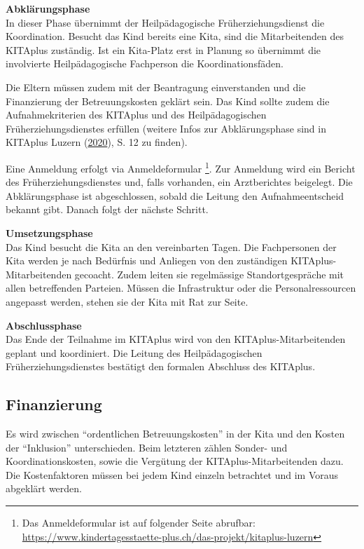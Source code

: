 \documentclass[
  ngerman,
  11pt,
  paper=a4,
  twoside,
  titlepage=true,
  openright,
  abstract=on,
  toc=listofnumbered,
  numbers=noenddot,
  chapterprefix=true,
  headings=optiontohead,
  svgnames,
  dvipsnames]{scrreprt}
\begin{document}
\textbf{Abklärungsphase}\\
In dieser Phase übernimmt der Heilpädagogische Früherziehungsdienst die
Koordination. Besucht das Kind bereits eine Kita, sind die
Mitarbeitenden des KITAplus zuständig. Ist ein Kita-Platz erst in
Planung so übernimmt die involvierte Heilpädagogische Fachperson die
Koordinationsfäden.

Die Eltern müssen zudem mit der Beantragung einverstanden und die
Finanzierung der Betreuungskosten geklärt sein. Das Kind sollte zudem
die Aufnahmekriterien des KITAplus und des Heilpädagogischen
Früherziehungsdienstes erfüllen (weitere Infos zur Abklärungsphase sind
in KITAplus Luzern (\protect\hyperlink{ref-konzeptKitaPlus}{2020}), S.
12 zu finden).

Eine Anmeldung erfolgt via Anmeldeformular \footnote{Das Anmeldeformular
  ist auf folgender Seite abrufbar:\\
  \url{https://www.kindertagesstaette-plus.ch/das-projekt/kitaplus-luzern}}.
Zur Anmeldung wird ein Bericht des Früherziehungsdienstes und, falls
vorhanden, ein Arztberichtes beigelegt. Die Abklärungsphase ist
abgeschlossen, sobald die Leitung den Aufnahmeentscheid bekannt gibt.
Danach folgt der nächste Schritt.

\textbf{Umsetzungsphase}\\
Das Kind besucht die Kita an den vereinbarten Tagen. Die Fachpersonen
der Kita werden je nach Bedürfnis und Anliegen von den zuständigen
KITAplus-Mitarbeitenden gecoacht. Zudem leiten sie regelmässige
Standortgespräche mit allen betreffenden Parteien. Müssen die
Infrastruktur oder die Personalressourcen angepasst werden, stehen sie
der Kita mit Rat zur Seite.

\textbf{Abschlussphase}\\
Das Ende der Teilnahme im KITAplus wird von den KITAplus-Mitarbeitenden
geplant und koordiniert. Die Leitung des Heilpädagogischen
Früherziehungsdienstes bestätigt den formalen Abschluss des KITAplus.

\hypertarget{finanzierung}{%
\subsection{Finanzierung}\label{finanzierung}}

Es wird zwischen “ordentlichen Betreuungskosten” in der Kita und den
Kosten der “Inklusion” unterschieden. Beim letzteren zählen Sonder- und
Koordinationskosten, sowie die Vergütung der KITAplus-Mitarbeitenden
dazu. Die Kostenfaktoren müssen bei jedem Kind einzeln betrachtet und im
Voraus abgeklärt werden.
\end{document}
